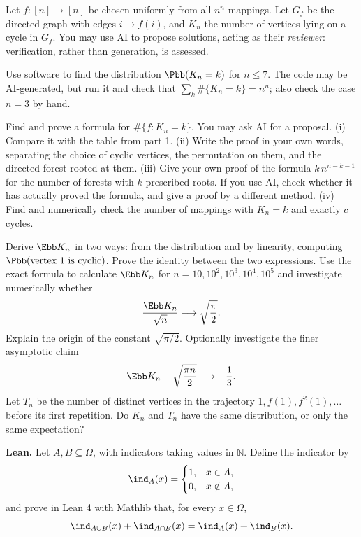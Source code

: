 \begin{researchtask}
Let $f:[n]\to[n]$ be chosen uniformly from all $n^n$ mappings. Let $G_f$ be the
directed graph with edges $i\to f(i)$, and $K_n$ the number of vertices lying on
a cycle in $G_f$. You may use AI to propose solutions, acting as their \emph{reviewer}:
verification, rather than generation, is assessed.
\begin{enumeratea}
  \item Use software to find the distribution $\Pbb(K_n=k)$ for $n\le 7$.
  The code may be AI-generated, but run it and check that
  $\sum_k\#\{K_n=k\}=n^n$; also check the case $n=3$ by hand.
  \item Find and prove a formula for $\#\{f:K_n=k\}$. You may ask AI for a proposal.
  (i) Compare it with the table from part 1. (ii) Write the proof in your own words,
  separating the choice of cyclic vertices, the permutation on them, and the directed
  forest rooted at them. (iii) Give your own proof of the formula $k\,n^{n-k-1}$
  for the number of forests with $k$ prescribed roots. If you use AI, check whether
  it has actually proved the formula, and give a proof by a different method.
  (iv) Find and numerically check the number of mappings with $K_n=k$ and exactly $c$ cycles.
  \item Derive $\Ebb K_n$ in two ways: from the distribution and by linearity,
  computing $\Pbb(\text{vertex }1\text{ is cyclic})$. Prove the identity between
  the two expressions. Use the exact formula to calculate $\Ebb K_n$ for
  $n=10,10^2,10^3,10^4,10^5$ and investigate numerically whether
  \[ \frac{\Ebb K_n}{\sqrt n}\longrightarrow\sqrt{\frac{\pi}{2}}. \]
  Explain the origin of the constant $\sqrt{\pi/2}$. Optionally investigate the finer asymptotic claim
  \[ \Ebb K_n-\sqrt{\frac{\pi n}{2}}\longrightarrow-\frac13. \]
  Let $T_n$ be the number of distinct vertices in the trajectory $1,f(1),f^2(1),\dots$
  before its first repetition. Do $K_n$ and $T_n$ have the same distribution,
  or only the same expectation?
\end{enumeratea}
\end{researchtask}
\noindent\textbf{Lean.} Let $A,B\subseteq\Omega$, with indicators taking values in $\mathbb N$.
Define the indicator by
\[
\ind_A(x)=\begin{cases}1,&x\in A,\\0,&x\notin A,\end{cases}
\]
and prove in Lean 4 with Mathlib that, for every $x\in\Omega$,
\[ \ind_{A\cup B}(x)+\ind_{A\cap B}(x)=\ind_A(x)+\ind_B(x). \]
